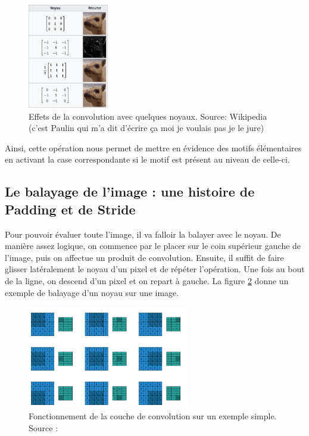 \begin{figure}[!h]
\centering
\includegraphics[width=100pt]{images/cnn/chien_prairie.png} 
\caption{Effets de la convolution avec quelques noyaux. Source: Wikipedia (c'est Paulin qui m'a dit d'écrire ça moi je voulais pas je le jure) }
\label{chien_prairie}
\end{figure}

Ainsi, cette opération nous permet de mettre en évidence des motifs élémentaires en activant la case correspondante si le motif est présent au niveau de celle-ci.

\subsection{Le balayage de l'image : une histoire de Padding et de Stride}

Pour pouvoir évaluer toute l'image, il va falloir la balayer avec le noyau. De manière assez logique, on commence par le placer sur le coin supérieur gauche de l'image, puis on affectue un produit de convolution. Ensuite, il suffit de faire glisser latéralement le noyau d'un pixel et de répéter l'opération. Une fois au bout de la ligne, on descend d'un pixel et on repart à gauche. La figure \ref{convolution} donne un exemple de balayage d'un noyau sur une image.

\begin{figure}[!h]
\centering
\includegraphics[width=200pt]{images/cnn/convolution.png}
\caption{Fonctionnement de la couche de convolution sur un exemple simple. Source : \cite{dumoulin_guide_2018} }
\label{convolution}
\end{figure}

